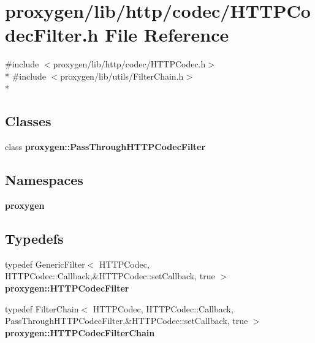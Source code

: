 \section{proxygen/lib/http/codec/\+H\+T\+T\+P\+Codec\+Filter.h File Reference}
\label{HTTPCodecFilter_8h}
{\ttfamily \#include $<$proxygen/lib/http/codec/\+H\+T\+T\+P\+Codec.\+h$>$}\\*
{\ttfamily \#include $<$proxygen/lib/utils/\+Filter\+Chain.\+h$>$}\\*
\subsection*{Classes}
\begin{DoxyCompactItemize}
\item 
class {\bf proxygen\+::\+Pass\+Through\+H\+T\+T\+P\+Codec\+Filter}
\end{DoxyCompactItemize}
\subsection*{Namespaces}
\begin{DoxyCompactItemize}
\item 
 {\bf proxygen}
\end{DoxyCompactItemize}
\subsection*{Typedefs}
\begin{DoxyCompactItemize}
\item 
typedef Generic\+Filter$<$ H\+T\+T\+P\+Codec, H\+T\+T\+P\+Codec\+::\+Callback,\&H\+T\+T\+P\+Codec\+::set\+Callback, true $>$ {\bf proxygen\+::\+H\+T\+T\+P\+Codec\+Filter}
\item 
typedef Filter\+Chain$<$ H\+T\+T\+P\+Codec, H\+T\+T\+P\+Codec\+::\+Callback, Pass\+Through\+H\+T\+T\+P\+Codec\+Filter,\&H\+T\+T\+P\+Codec\+::set\+Callback, true $>$ {\bf proxygen\+::\+H\+T\+T\+P\+Codec\+Filter\+Chain}
\end{DoxyCompactItemize}

